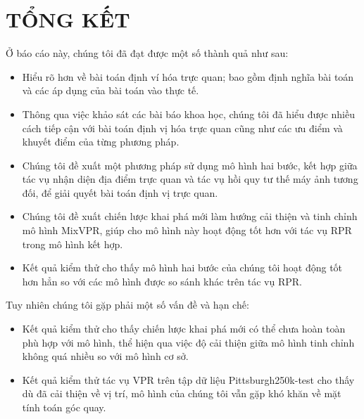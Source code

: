 \chapter{TỔNG KẾT}

Ở báo cáo này, chúng tôi đã đạt được một số thành quả như sau:
\begin{itemize}
	\item Hiểu rõ hơn về bài toán định ví hóa trực quan; bao gồm định nghĩa bài toán và các áp dụng của bài toán vào thực tế.
	\item Thông qua việc khảo sát các bài báo khoa học, chúng tôi đã hiểu được nhiều cách tiếp cận với bài toán định vị hóa trực quan cũng như các ưu điểm và khuyết điểm của từng phương pháp.
	\item Chúng tôi đề xuất một phương pháp sử dụng mô hình hai bước, kết hợp giữa tác vụ nhận diện địa điểm trực quan và tác vụ hồi quy tư thế máy ảnh tương đối, để giải quyết bài toán định vị trực quan.
	\item Chúng tôi đề xuất chiến lược khai phá mới làm hướng cải thiện và tinh chỉnh mô hình MixVPR, giúp cho mô hình này hoạt động tốt hơn với tác vụ RPR trong mô hình kết hợp.
	\item Kết quả kiểm thử cho thấy mô hình hai bước của chúng tôi hoạt động tốt hơn hẳn so với các mô hình được so sánh khác trên tác vụ RPR.
\end{itemize}

Tuy nhiên chúng tôi gặp phải một số vấn đề và hạn chế:
\begin{itemize}
	\item Kết quả kiểm thử cho thấy chiến lược khai phá mới có thể chưa hoàn toàn phù hợp với mô hình, thể hiện qua việc độ cải thiện giữa mô hình tinh chỉnh không quá nhiều so với mô hình cơ sở.
	\item Kết quả kiểm thử tác vụ VPR trên tập dữ liệu Pittsburgh250k-test cho thấy dù đã cải thiện về vị trí, mô hình của chúng tôi vẫn gặp khó khăn về mặt tính toán góc quay.
\end{itemize}

